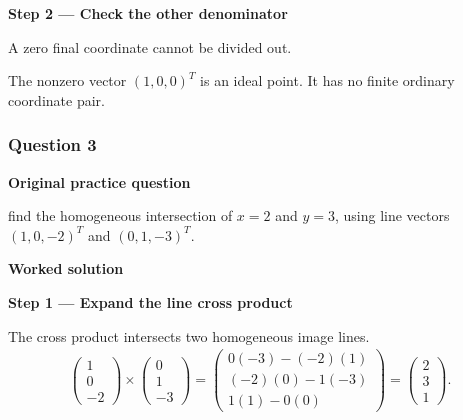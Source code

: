 \documentclass[letterpaper,11pt,english,openany,oneside]{jupyterBook}
\begin{document}
\par\medskip{}
{\color{QuizStepRed}\bfseries Step 2 — Check the other denominator}\par\smallskip

\sphinxAtStartPar
{} A zero final coordinate cannot be divided out.

\sphinxAtStartPar
The nonzero vector {\color{QuizMathBlue} \((1,0,0)^T\)} is an ideal point. It has no finite ordinary coordinate pair.

\par

\par\medskip


\subsubsection{Question 3}
\label{\detokenize{lectures/lecture01/tldr:question-3}}\label{\detokenize{lectures/lecture01/tldr:lec01-tldr-q3}}
\par\medskip\textbf{Original practice question}\par\smallskip

\sphinxAtStartPar
{} find the homogeneous intersection of \(x=2\) and \(y=3\), using line vectors \((1,0,-2)^T\) and \((0,1,-3)^T\).

\par\medskip

\par\medskip
\textbf{Worked solution}\par\smallskip

\par\medskip{}
{\color{QuizStepRed}\bfseries Step 1 — Expand the line cross product}\par\smallskip

\sphinxAtStartPar
{} The cross product intersects two homogeneous image lines.
{\color{QuizMathBlue} \begin{equation*}
\begin{split}
\begin{pmatrix}1\\0\\-2\end{pmatrix}\times\begin{pmatrix}0\\1\\-3\end{pmatrix}=\begin{pmatrix}0(-3)-(-2)(1)\\(-2)(0)-1(-3)\\1(1)-0(0)\end{pmatrix}=\begin{pmatrix}2\\3\\1\end{pmatrix}.
\end{split}
\end{equation*}}
\par
\end{document}
